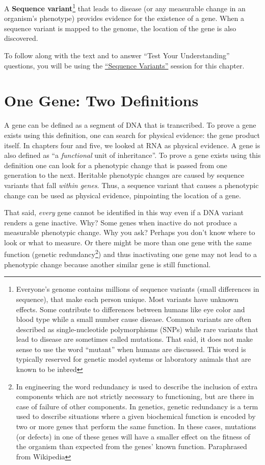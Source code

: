 \documentclass[
]{book}
\begin{document}
A \textbf{Sequence variant}\footnote{Everyone's genome contains millions of sequence variants (small differences in sequence), that make each person unique. Most variants have unknown effects. Some contribute to differences between humans like eye color and blood type while a small number cause disease. Common variants are often described as single-nucleotide polymorphisms (SNPs) while rare variants that lead to disease are sometimes called mutations. That said, it does not make sense to use the word ``mutant'' when humans are discussed. This word is typically reserved for genetic model systems or laboratory animals that are known to be inbred} that leads to disease (or any measurable change in an organism's phenotype) provides evidence for the existence of a gene. When a sequence variant is mapped to the genome, the location of the gene is also discovered.

To follow along with the text and to answer ``Test Your Understanding'' questions, you will be using the \href{https://genome.ucsc.edu/s/megallegos/Biol\%20310\%3A\%20Module\%204\%3A\%20Mutational\%20Analysis}{``Sequence Variants''} session for this chapter.

\hypertarget{one-gene-two-definitions}{%
\section{One Gene: Two Definitions}\label{one-gene-two-definitions}}

A gene can be defined as a segment of DNA that is transcribed. To prove a gene exists using this definition, one can search for physical evidence: the gene product itself. In chapters four and five, we looked at RNA as physical evidence. A gene is also defined as ``a \emph{functional} unit of inheritance''. To prove a gene exists using this definition one can look for a phenotypic change that is passed from one generation to the next. Heritable phenotypic changes are caused by sequence variants that fall \emph{within genes}. Thus, a sequence variant that causes a phenotypic change can be used as physical evidence, pinpointing the location of a gene.

That said, \emph{every} gene cannot be identified in this way even if a DNA variant renders a gene inactive. Why? Some genes when inactive do not produce a measurable phenotypic change. Why you ask? Perhaps you don't know where to look or what to measure. Or there might be more than one gene with the same function (genetic redundancy\footnote{In engineering the word redundancy is used to describe the inclusion of extra components which are not strictly necessary to functioning, but are there in case of failure of other components. In genetics, genetic redundancy is a term used to describe situations where a given biochemical function is encoded by two or more genes that perform the same function. In these cases, mutations (or defects) in one of these genes will have a smaller effect on the fitness of the organism than expected from the genes' known function. Paraphrased from Wikipedia}) and thus inactivating one gene may not lead to a phenotypic change because another similar gene is still functional.
\end{document}
